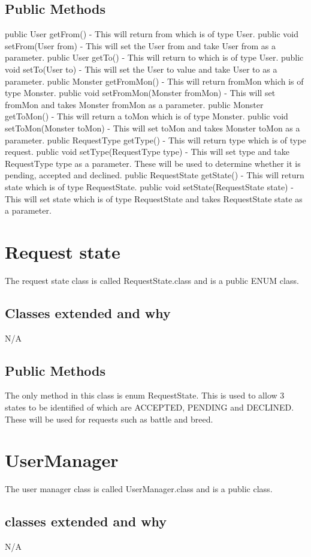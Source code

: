 \documentclass{project}
\begin{document}
\subsection{Public Methods}
public User getFrom() - This will return from which is of type User. public void setFrom(User from) - This will set the User from and take User from as a parameter.
public User getTo() - This will return to which is of type User. public void setTo(User to) - This will set the User to value and take User to as a parameter.
public Monster getFromMon() - This will return fromMon which is of type Monster. public void setFromMon(Monster fromMon) - This will set fromMon and takes Monster fromMon as a parameter.
public Monster getToMon() - This will return a toMon which is of type Monster. public void setToMon(Monster toMon) - This will set toMon and takes Monster toMon as a parameter.
public RequestType getType() - This will return type which is of type request. public void setType(RequestType type) - This will set type and take RequestType type as a parameter. These will be used to determine whether it is pending, accepted and declined.
public RequestState getState() - This will return state which is of type RequestState. public void setState(RequestState state) - This will set state which is of type RequestState and takes RequestState state as a parameter.

\section{Request state}
The request state class is called RequestState.class and is a public ENUM class.
\subsection{Classes extended and why}
N/A
\subsection{Public Methods}
The only method in this class is enum RequestState. This is used to allow 3 states to be identified of which are ACCEPTED, PENDING and DECLINED. These will be used for requests such as battle and breed.

\section{UserManager}
The user manager class is called UserManager.class and is a public class.
\subsection{classes extended and why}
N/A
\end{document}
